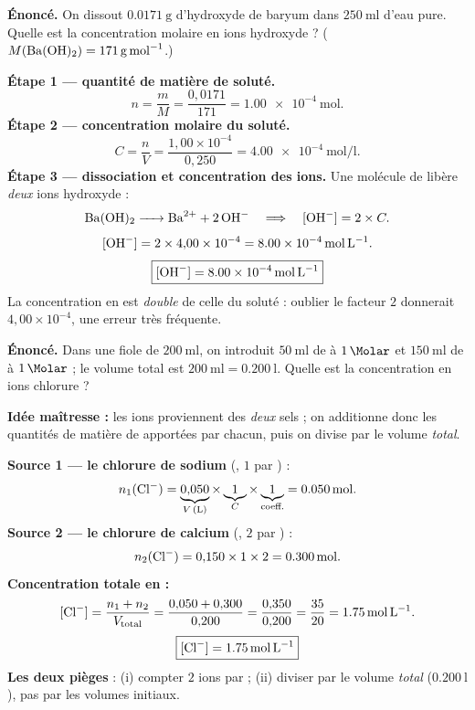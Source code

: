 \documentclass[11pt,a4paper]{article}
\begin{document}
\begin{exemple}
\textbf{Énoncé.} On dissout $\SI{0.0171}{\gram}$ d'hydroxyde de baryum  dans
$\SI{250}{\milli\litre}$ d'eau pure. Quelle est la concentration molaire en ions hydroxyde  ?
($M(\ce{Ba(OH)2}) = \SI{171}{\gram\per\mole}$.)

\smallskip
\textbf{Étape 1 — quantité de matière de soluté.}
\[ n = \frac{m}{M} = \frac{0{,}0171}{171} = \SI{1.00e-4}{\mole}. \]
\textbf{Étape 2 — concentration molaire du soluté.}
\[ C = \frac{n}{V} = \frac{1{,}00\times10^{-4}}{0{,}250} = \SI{4.00e-4}{\mole\per\litre}. \]
\textbf{Étape 3 — dissociation et concentration des ions.} Une molécule de  libère
\emph{deux} ions hydroxyde :
\[ \ce{Ba(OH)2 -> Ba^2+ + 2 OH-} \quad\Longrightarrow\quad [\ce{OH-}] = 2\times C. \]
\[ [\ce{OH-}] = 2\times 4{,}00\times10^{-4} = \SI{8.00e-4}{\mole\per\litre}. \]
\[ \boxed{[\ce{OH-}] = \SI{8.00e-4}{\mole\per\litre}} \]
La concentration en  est \emph{double} de celle du soluté : oublier le facteur $2$ donnerait
$4{,}00\times10^{-4}$, une erreur très fréquente.
\end{exemple}

\begin{exemple}\label{ex:melange}
\textbf{Énoncé.} Dans une fiole de $\SI{200}{\milli\litre}$, on introduit $\SI{50}{\milli\litre}$ de
 à $\SI{1}{\Molar}$ et $\SI{150}{\milli\litre}$ de  à $\SI{1}{\Molar}$ ; le volume
total est $\SI{200}{\milli\litre} = \SI{0.200}{\litre}$. Quelle est la concentration en ions chlorure
 ?

\smallskip
\textbf{Idée maîtresse :} les ions  proviennent des \emph{deux} sels ; on additionne donc les
quantités de matière de  apportées par chacun, puis on divise par le volume \emph{total}.

\smallskip
\textbf{Source 1 — le chlorure de sodium} (, $1$  par ) :
\[ n_1(\ce{Cl-}) = \underbrace{0{,}050}_{V\,(\si{\litre})}\times \underbrace{1}_{C}\times \underbrace{1}_{\text{coeff.}} = \SI{0.050}{\mole}. \]
\textbf{Source 2 — le chlorure de calcium} (, $2$  par ) :
\[ n_2(\ce{Cl-}) = 0{,}150\times 1\times 2 = \SI{0.300}{\mole}. \]
\textbf{Concentration totale en  :}
\[ [\ce{Cl-}] = \frac{n_1+n_2}{V_{\text{total}}} = \frac{0{,}050+0{,}300}{0{,}200}
   = \frac{0{,}350}{0{,}200} = \frac{35}{20} = \SI{1.75}{\mole\per\litre}. \]
\[ \boxed{[\ce{Cl-}] = \SI{1.75}{\mole\per\litre}} \]
\textbf{Les deux pièges} : (i) compter $2$ ions  par  ; (ii) diviser par le volume
\emph{total} ($\SI{0.200}{\litre}$), pas par les volumes initiaux.
\end{exemple}
\end{document}
